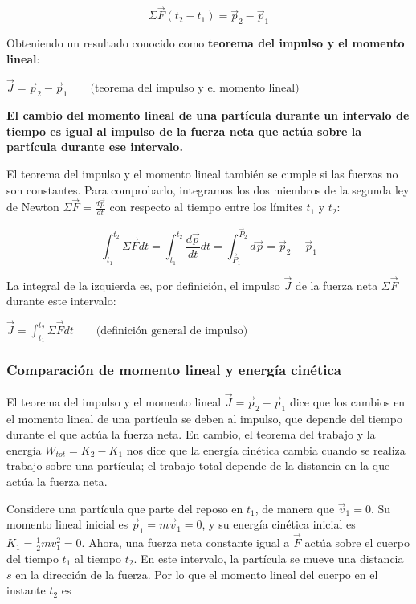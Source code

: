 \documentclass{article}
\newcommand{\newtitle}[1]{
    \color{titleColor}
    \subsubsection{#1}
    \color{black}
}
\newcommand{\bl}[1]{\textbf{#1}}
\newcommand{\definicion}[1]{%
    \vspace{0.5cm}
    \begin{definicionbox}
        #1
    \end{definicionbox}
    \vspace{0.5cm}
}
\begin{document}
    \[ \Sigma \vec{F} (t_2 - t_1) = \vec{p}_2 - \vec{p}_1 \]

    \par Obteniendo un resultado conocido como \bl{teorema del impulso y el momento lineal}:

    \definicion{
        \centering
        \( \vec{J} = \vec{p}_2 - \vec{p}_1 \quad \quad \text{(teorema del impulso y el momento lineal)} \)
    }

    \definicion{
        \bl{El cambio del momento lineal de una partícula durante un intervalo de tiempo es igual al impulso de la fuerza neta que actúa sobre la partícula durante ese intervalo.}
    }

    \par El teorema del impulso y el momento lineal también se cumple si las fuerzas no son constantes. Para comprobarlo, integramos los dos miembros de la segunda ley de Newton $\Sigma \vec{F} = \frac{d \vec{p}}{dt}$ con respecto al tiempo entre los límites $t_1$ y $t_2$:

    \[ \int_{t_1}^{t_2} \Sigma \vec{F} dt = \int_{t_1}^{t_2} \frac{d \vec{p}}{dt} dt = \int_{\vec{P}_1}^{\vec{P}_2} d \vec{p} = \vec{p}_2 - \vec{p}_1 \]

    \par La integral de la izquierda es, por deﬁnición, el impulso $\vec{J}$ de la fuerza neta $\Sigma \vec{F}$ durante este intervalo:

    \definicion{
        \centering
        \( \vec{J} = \int_{t_1}^{t_2} \Sigma \vec{F} dt \quad \quad \text{(deﬁnición general de impulso)} \)
    }

    \newtitle{Comparación de momento lineal y energía cinética}

    \par El teorema del impulso y el momento lineal $\vec{J} = \vec{p}_2 - \vec{p}_1$ dice que los cambios en el momento lineal de una partícula se deben al impulso, que depende del tiempo durante el que actúa la fuerza neta. En cambio, el teorema del trabajo y la energía $W_{tot} = K_2 - K_1$ nos dice que la energía cinética cambia cuando se realiza trabajo sobre una partícula; el trabajo total depende de la distancia en la que actúa la fuerza neta. 

    \par Considere una partícula que parte del reposo en $t_1$, de manera que $\vec{v}_1 = 0$. Su momento lineal inicial es $\vec{p}_1 = m \vec{v}_1 = 0$, y su energía cinética inicial es $K_1 = \frac{1}{2} m v_1^2 = 0$. Ahora, una fuerza neta constante igual a $\vec{F}$ actúa sobre el cuerpo del tiempo $t_1$ al tiempo $t_2$. En este intervalo, la partícula se mueve una distancia $s$ en la dirección de la fuerza. Por lo que el momento lineal del cuerpo en el instante $t_2$ es
\end{document}
